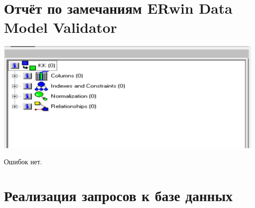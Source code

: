 \section {Отчёт по замечаниям ERwin Data Model Validator}

\includegraphics[width=17cm]{./screenshots/validator/validator.png}

Ошибок нет.

\section{Реализация запросов к базе данных}

